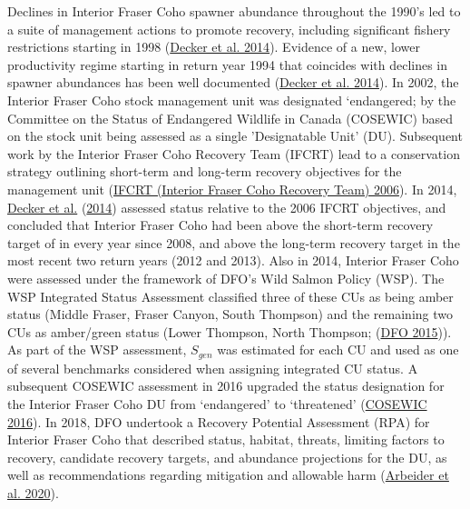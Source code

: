 \documentclass[11pt]{book}
\begin{document}
Declines in Interior Fraser Coho spawner abundance throughout the 1990's led to a suite of management actions to promote recovery, including significant fishery restrictions starting in 1998 (\protect\hyperlink{ref-deckerAssessmentInteriorFraser2014}{Decker et al. 2014}). Evidence of a new, lower productivity regime starting in return year 1994 that coincides with declines in spawner abundances has been well documented (\protect\hyperlink{ref-deckerAssessmentInteriorFraser2014}{Decker et al. 2014}). In 2002, the Interior Fraser Coho stock management unit was designated `endangered; by the Committee on the Status of Endangered Wildlife in Canada (COSEWIC) based on the stock unit being assessed as a single 'Designatable Unit' (DU). Subsequent work by the Interior Fraser Coho Recovery Team (IFCRT) lead to a conservation strategy outlining short-term and long-term recovery objectives for the management unit (\protect\hyperlink{ref-ifcrtinteriorfrasercohorecoveryteamConservationStrategyCoho2006}{IFCRT (Interior Fraser Coho Recovery Team) 2006}). In 2014, \protect\hyperlink{ref-deckerAssessmentInteriorFraser2014}{Decker et al.} (\protect\hyperlink{ref-deckerAssessmentInteriorFraser2014}{2014}) assessed status relative to the 2006 IFCRT objectives, and concluded that Interior Fraser Coho had been above the short-term recovery target of in every year since 2008, and above the long-term recovery target in the most recent two return years (2012 and 2013). Also in 2014, Interior Fraser Coho were assessed under the framework of DFO's Wild Salmon Policy (WSP). The WSP Integrated Status Assessment classified three of these CUs as being amber status (Middle Fraser, Fraser Canyon, South Thompson) and the remaining two CUs as amber/green status (Lower Thompson, North Thompson; (\protect\hyperlink{ref-dfoWildSalmonPolicy2015}{DFO 2015})). As part of the WSP assessment, \(S_{gen}\) was estimated for each CU and used as one of several benchmarks considered when assigning integrated CU status. A subsequent COSEWIC assessment in 2016 upgraded the status designation for the Interior Fraser Coho DU from `endangered' to `threatened' (\protect\hyperlink{ref-cosewicCOSEWICAssessmentStatus2016}{COSEWIC 2016}). In 2018, DFO undertook a Recovery Potential Assessment (RPA) for Interior Fraser Coho that described status, habitat, threats, limiting factors to recovery, candidate recovery targets, and abundance projections for the DU, as well as recommendations regarding mitigation and allowable harm (\protect\hyperlink{ref-arbeiderInteriorFraserCoho2020}{Arbeider et al. 2020}).
\end{document}
